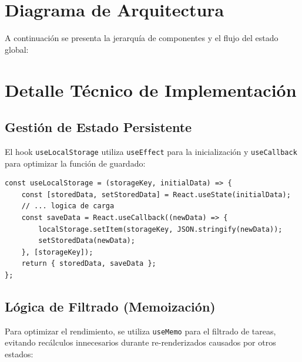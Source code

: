 \documentclass[12pt,a4paper]{article}
\begin{document}
\section{Diagrama de Arquitectura}
A continuación se presenta la jerarquía de componentes y el flujo del estado global:

\begin{center}
\end{center}

\section{Detalle Técnico de Implementación}

\subsection{Gestión de Estado Persistente}
El hook \texttt{useLocalStorage} utiliza \texttt{useEffect} para la inicialización y \texttt{useCallback} para optimizar la función de guardado:

\begin{lstlisting}[caption={Fragmento de useLocalStorage.js}]
const useLocalStorage = (storageKey, initialData) => {
    const [storedData, setStoredData] = React.useState(initialData);
    // ... logica de carga
    const saveData = React.useCallback((newData) => {
        localStorage.setItem(storageKey, JSON.stringify(newData));
        setStoredData(newData);
    }, [storageKey]);
    return { storedData, saveData };
};
\end{lstlisting}

\subsection{Lógica de Filtrado (Memoización)}
Para optimizar el rendimiento, se utiliza \texttt{useMemo} para el filtrado de tareas, evitando recálculos innecesarios durante re-renderizados causados por otros estados:
\end{document}
